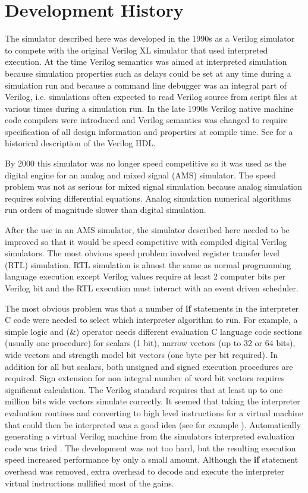 \documentclass[preprint, authoryear]{sigplanconf}
\begin{document}
\section{Development History}
\par
The simulator described here was developed in the 1990s as a
Verilog simulator to compete with the original Verilog XL
simulator that used interpreted execution.
At the time Verilog semantics was aimed at interpreted simulation
because simulation properties such as delays could be set at any
time during a simulation run and because a command line debugger was
an integral part of Verilog, i.e. simulations often expected to
read Verilog source from script files at various times during a simulation run.
In the late 1990s Verilog native machine code compilers were introduced
and Verilog semantics was changed to require specification of all
design information and properties at compile time.
See \cite{Thomas2002} for a historical description of the
Verilog HDL.
\par
By 2000 this simulator was no longer speed competitive so it was used as the
digital engine for an analog and mixed signal (AMS) simulator.
The speed problem was not as serious for mixed signal
simulation because analog simulation requires solving differential
equations.  Analog simulation numerical algorithms run orders
of magnitude slower than digital simulation.
\par
After the use in an AMS simulator, the simulator described here needed
to be improved so that it would be speed competitive with compiled
digital Verilog simulators.
The most obvious speed problem involved register transfer level (RTL)
simulation.  RTL simulation is almost the same as normal programming
language execution except Verilog values require at least 2 computer bits
per Verilog bit and the RTL execution must interact with an event driven
scheduler.
\par
The most obvious problem was that a number of \textbf{if} statements in the
interpreter C code were needed to select which interpreter algorithm
to run.  For example, a simple logic and (\&) operator
needs different evaluation C language code sections (usually one procedure)
for scalars (1 bit), narrow vectors (up to 32 or 64 bits), wide vectors
and strength model bit vectors (one byte per bit required).
In addition for all but scalars, both unsigned and signed execution
procedures are required. 
Sign extension for non integral number of word bit vectors
requires significant calculation.  The Verilog standard requires that at least
up to one million bits wide vectors simulate correctly.
It seemed that taking the interpreter evaluation routines and converting
to high level instructions for a virtual machine that could then be
interpreted was a good idea (see for example \cite{Ertl2003}).
Automatically generating a virtual Verilog machine from the simulators
interpreted evaluation code was tried \cite{Ertl2002}.
The development was not too hard, but the resulting execution speed
increased performance by only a small amount.
Although the \textbf{if} statement overhead
was removed, extra overhead to decode and execute the interpreter
virtual instructions nullified most of the gains.
\end{document}
